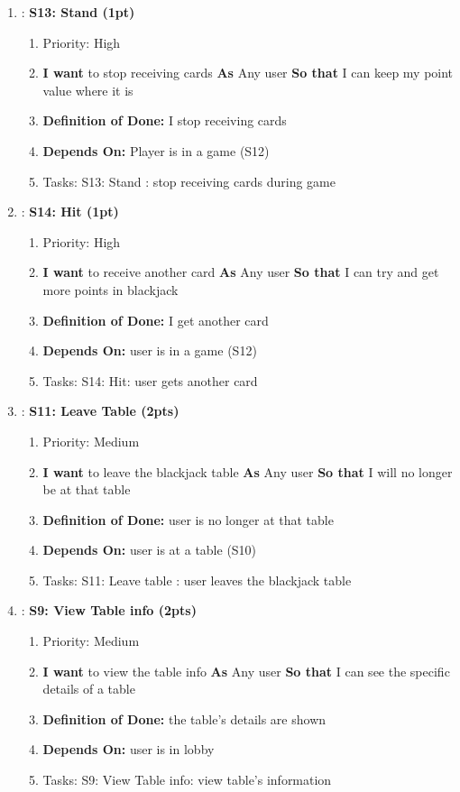 \begin{enumerate}
    \item: \textbf{S13: Stand (1pt)}
    \begin{enumerate}
        \item Priority: High
        \item \textbf{I want} to stop receiving cards \textbf{As} Any user \textbf{So that} I can keep my point value where it is
        \item \textbf{Definition of Done:} I stop receiving cards
        \item \textbf{Depends On:} Player is in a game (S12)
        \item Tasks: S13: Stand : stop receiving cards during game
    \end{enumerate}

    \item: \textbf{S14: Hit (1pt)}
    \begin{enumerate}
        \item Priority: High
        \item \textbf{I want} to receive another card \textbf{As} Any user \textbf{So that} I can try and get more points in blackjack 
        \item \textbf{Definition of Done:} I get another card
	\item \textbf{Depends On:} user is in a game (S12)
        \item Tasks: S14: Hit: user gets another card
    \end{enumerate}

     \item: \textbf{S11: Leave Table (2pts)}
    \begin{enumerate}
        \item Priority: Medium
        \item \textbf{I want} to leave the blackjack table \textbf{As} Any user \textbf{So that} I will no longer be at that table
        \item \textbf{Definition of Done:} user is no longer at that table
        \item \textbf{Depends On:} user is at a table (S10)
        \item Tasks: S11: Leave table : user leaves the blackjack table
    \end{enumerate}

    \item: \textbf{S9: View Table info (2pts)}
    \begin{enumerate}
        \item Priority: Medium
        \item \textbf{I want} to view the table info \textbf{As} Any user \textbf{So that} I can see the specific details of a table
        \item \textbf{Definition of Done:} the table's details are shown
        \item \textbf{Depends On:} user is in lobby
        \item Tasks: S9: View Table info: view table's information
    \end{enumerate}


\end{enumerate}

